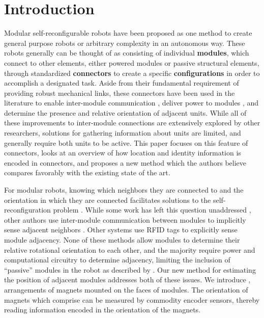 \section{Introduction}
\label{sec:Introduction}

Modular self-reconfigurable robots have been proposed as one method to create general purpose robots or arbitrary complexity in an autonomous way. These robots generally can be thought of as consisting of individual \textbf{modules}, which connect to other elements, either powered modules or passive structural elements, through standardized \textbf{connectors} to create a specific \textbf{configurations} in order to accomplish a designated task. Aside from their fundamental requirement of providing robust mechanical links, these connectors have been used in the literature to enable inter-module communication \cite{liedke2013collective} \cite{TosunDaveyLiuYim-IROS2016}, deliver power to modules \cite{todo} \cite{todo}, and determine the presence and relative orientation of adjacent units. While all of these improvements to inter-module connections are extensively explored by other researchers, solutions for gathering information about units are limited, and generally require both units to be active.  This paper focuses on this feature of connectors, looks at an overview of how location and identity information is encoded in connectors, and proposes a new method which the authors believe compares favorably with the existing state of the art.

For modular robots, knowing which neighbors they are connected to and the orientation in which they are connected facilitates solutions to the self-reconfiguration problem \cite{AHMADZADEH201527} \cite{surveyyim}. While some work has left this question unaddressed \cite{Neubert2016}, other authors use inter-module communication between modules to implicitly sense adjacent neighbors \cite{liedke2013collective} \cite{Gilpin-Thesis06} \cite{TosunDaveyLiuYim-IROS2016}.  Other systems use RFID tags \cite{Werfel-PhDThesis06} to explicitly sense module adjacency.  None of these methods allow modules to determine their relative rotational orientation to each other, and the majority require power and computational circuitry to determine adjacency, limiting the inclusion of ``passive'' modules in the robot as described by \cite{roombots5}.  Our new method for estimating the position of adjacent modules addresses both of these issues.  We introduce \tagNamePlural, arrangements of magnets mounted on the faces of modules.  The orientation of magnets which comprise \tagNamePlural can be measured by commodity encoder sensors, thereby reading information encoded in the orientation of the magnets.

